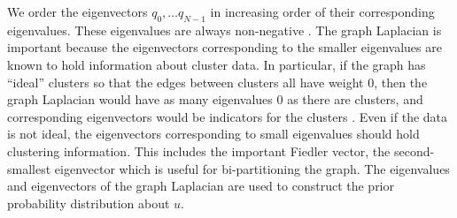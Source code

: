 \documentclass{siamart1116}
\begin{document}
    We order the eigenvectors $q_0, \ldots q_{N-1}$ in increasing order of their corresponding eigenvalues. These eigenvalues are always non-negative \cite{Spectral}. The graph Laplacian is important because the eigenvectors corresponding to the smaller eigenvalues are known to hold information about cluster data. In particular, if the graph has ``ideal'' clusters so that the edges between clusters all have weight 0, then the graph Laplacian would have as many eigenvalues 0 as there are clusters, and corresponding eigenvectors would be indicators for the clusters \cite{Spectral}. Even if the data is not ideal, the eigenvectors corresponding to small eigenvalues should hold clustering information. This includes the important Fiedler vector, the second-smallest eigenvector which is useful for bi-partitioning the graph. The eigenvalues and eigenvectors of the graph Laplacian are used to construct the prior probability distribution about $u$.
\end{document}
